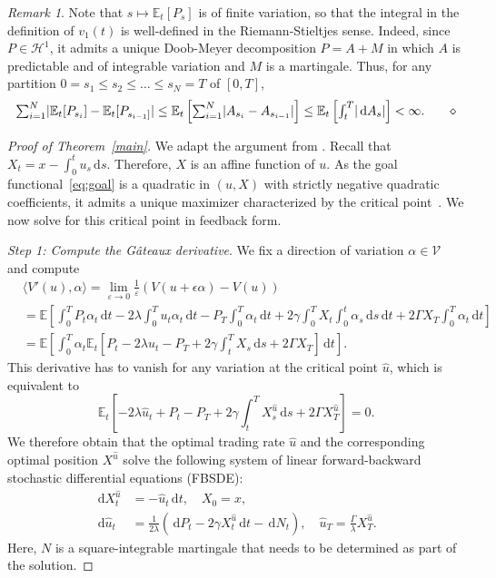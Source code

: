 \documentclass[11pt]{article}
\theoremstyle{definition}
\theoremstyle{remark}
\newtheorem{rem}[thm]{Remark}
\newcommand{\E}{\mathbb{E}} %
\DeclarePairedDelimiter{\abs}{\lvert}{\rvert} %
\newcommand{\ts}{\textstyle}
\newcommand{\closeEqn}{\tag*{$\diamond$}}
\newcommand{\de}{\,\mathrm{d}}
\begin{document}
\begin{rem}\label{RemIntegral}
Note that $s\mapsto \E_t[P_s]$ is of finite variation, so that the integral in the definition of $v_1(t)$ is well-defined in the Riemann-Stieltjes sense. Indeed, since $P\in \mathcal{H}^1$, it admits a unique Doob-Meyer decomposition $P=A+M$ in which $A$ is predictable and of integrable variation and $M$ is a martingale. Thus, for any partition $0=s_1 \leq s_2 \leq \ldots \leq s_N=T$ of $[0,T]$,
\[
 \ts \sum_{i=1}^N \abs{\E_t[P_{s_i}] - \E_t[P_{s_{i-1}]}} \le \E_t\left[\sum_{i=1}^N \abs{A_{s_i} - A_{s_{i-1}}}\right] \le \E_t \left[\int_t^T \abs{\de A_s}\right] < \infty.\closeEqn
\]
\end{rem}

\begin{proof}[Proof of Theorem~\ref{main}]
We adapt the argument from \cite{bank.al.17,bouchard2017equilibrium}. Recall that $X_t = x-\int_0^t u_s \de s$. Therefore, $X$ is an affine function of $u$. As the goal functional~\eqref{eq:goal} is a quadratic in $(u,X)$ with strictly negative quadratic coefficients, it admits a unique maximizer characterized by the critical point~\cite{ekeland1999convex}. We now solve for this critical point in feedback form.

\emph{Step 1: Compute the G\^ateaux derivative}. We fix a direction of variation $\alpha \in \mathcal{V}$ and compute
\begin{align*}
&\langle V'(u), \alpha \rangle = \lim_{\varepsilon \to 0}\tfrac{1}{\varepsilon}(V(u+\epsilon\alpha)-V(u))  \\
&= \E\left[\int_0^T P_t \alpha_t \de t - 2\lambda\int_0^T u_t \alpha_t \de t - P_T \int_0^T \alpha_t \de t + 2\gamma\int_0^T X_t \int_0^t \alpha_s \de s \de t + 2\Gamma X_T \int_0^T \alpha_t \de t \right] \\
&= \E\left[\int_0^T \alpha_t \E_t\left[P_t - 2\lambda u_t - P_T + 2\gamma\int_t^T X_s \de s + 2\Gamma X_T \right] \de t\right].
\end{align*}
This derivative has to vanish for any variation at the critical point $\hat{u}$, which is equivalent to
\begin{equation}\label{eq:foc}
\E_t\left[-2\lambda \hat{u}_t + P_t - P_T + 2\gamma\int_t^T X^{\hat{u}}_s \de s + 2\Gamma X^{\hat{u}}_T \right] = 0.
\end{equation}
We therefore obtain that the optimal trading rate $\hat{u}$ and the corresponding optimal position $X^{\hat{u}}$ solve the following system of linear forward-backward stochastic differential equations (FBSDE):
\begin{equation}\label{eq:FBSDE}
\begin{split}
\de X^{\hat{u}}_t &= - \hat{u}_t \de t, \quad X_0=x, \\
\de\hat{u}_t &= \frac{1}{2\lambda}\left(\de P_t-2\gamma X^{\hat{u}}_t \de t - \de N_t\right), \quad \hat{u}_T=\frac{\Gamma}{\lambda} X^{\hat{u}}_T.
\end{split}
\end{equation}
Here, $N$ is a square-integrable martingale that needs to be determined as part of the solution. 


\end{proof}
\end{document}
